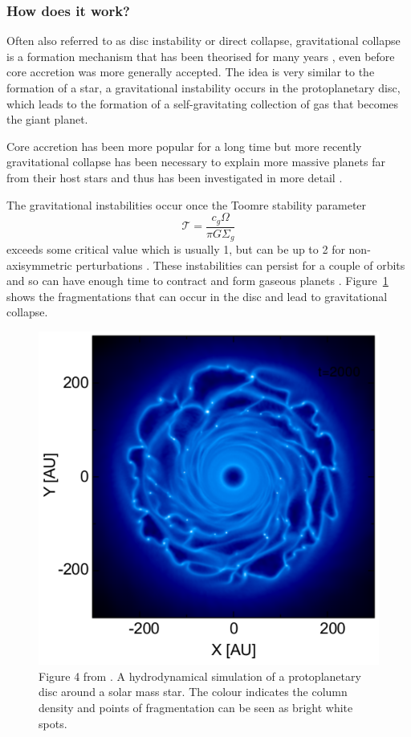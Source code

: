 \documentclass[twocolumn]{aastex631}
\begin{document}
\subsubsection{How does it work?}

Often also referred to as disc instability or direct collapse, gravitational collapse is a formation mechanism that has been theorised for many years \citep{Kuiper+1951}, even before core accretion was more generally accepted. The idea is very similar to the formation of a star, a gravitational instability occurs in the protoplanetary disc, which leads to the formation of a self-gravitating collection of gas that becomes the giant planet.

Core accretion has been more popular for a long time but more recently gravitational collapse has been necessary to explain more massive planets far from their host stars and thus has been investigated in more detail \citep{Durisen+2007}.

The gravitational instabilities occur once the Toomre stability parameter \citep{Toomre+1964}
\begin{equation}
    \mathcal{T} = \frac{c_g \Omega}{\pi G \Sigma_g}
\end{equation}
exceeds some critical value which is usually 1, but can be up to 2 for non-axisymmetric perturbations \citep{Binney+1987}. These instabilities can persist for a couple of orbits and so can have enough time to contract and form gaseous planets \citep{Forgan+2017}. Figure~\ref{fig:fragmentation} shows the fragmentations that can occur in the disc and lead to gravitational collapse.

\begin{figure}
    \centering
    \includegraphics[width=\columnwidth]{fragmentation.png}
    \caption{Figure 4 from \citet{Forgan+2017}. A hydrodynamical simulation of a protoplanetary disc around a solar mass star. The colour indicates the column density and points of fragmentation can be seen as bright white spots.}
    \label{fig:fragmentation}
\end{figure}
\end{document}
